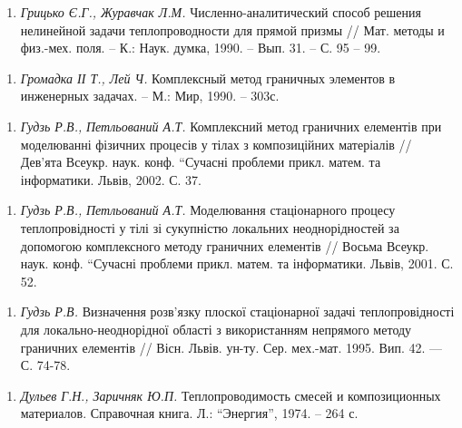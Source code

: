 \begin{enumerate}
\def\labelenumi{\arabic{enumi}.}
\tightlist
\item
  \emph{Грицько Є.Г., Журавчак Л.М. }Численно-аналитический способ
  решения нелинейной задачи теплопроводности для прямой призмы // Мат.
  методы и физ.-мех. поля. -- К.: Наук. думка, 1990. -- Вып. 31. -- С.
  95 -- 99.
\end{enumerate}

\begin{enumerate}
\def\labelenumi{\arabic{enumi}.}
\tightlist
\item
  \protect\hypertarget{anchor-6}{}{}\emph{Громадка ІІ Т., Лей Ч.}
  Комплексный метод граничных элементов в инженерных задачах. -- М.:
  Мир, 1990. -- 303с.
\end{enumerate}

\begin{enumerate}
\def\labelenumi{\arabic{enumi}.}
\tightlist
\item
  \emph{ Гудзь Р.В.,} \emph{Петльований А.Т. }Комплексний метод
  граничних елементів при моделюванні фізичних процесів у тілах з
  композиційних матеріалів // Дев'ята Всеукр. наук. конф. ``Сучасні
  проблеми прикл. матем. та інформатики. Львів, 2002. С. 37.
\end{enumerate}

\begin{enumerate}
\def\labelenumi{\arabic{enumi}.}
\tightlist
\item
  \emph{ Гудзь Р.В.,} \emph{Петльований А.Т. }Моделювання стаціонарного
  процесу теплопровідності у тілі зі сукупністю локальних
  неоднорідностей за допомогою комплексного методу граничних елементів
  // Восьма Всеукр. наук. конф. ``Сучасні проблеми прикл. матем. та
  інформатики. Львів, 2001. С. 52.
\end{enumerate}

\begin{enumerate}
\def\labelenumi{\arabic{enumi}.}
\tightlist
\item
  \emph{ }\protect\hypertarget{anchor-7}{}{}\emph{Гудзь Р.В.} Визначення
  розв'язку плоскої стаціонарної задачі теплопровідності для
  локально-неоднорідної області з використанням непрямого методу
  граничних елементів // Вісн. Львів. ун-ту. Сер. мех.-мат. 1995. Вип.
  42. --- С. 74-78.
\end{enumerate}

\begin{enumerate}
\def\labelenumi{\arabic{enumi}.}
\tightlist
\item
  \emph{ Дульев Г}.\emph{Н}.\emph{, Заричняк Ю.П. }Теплопроводимость
  смесей и композиционных материалов. Справочная книга. Л.: ``Энергия'',
  1974. -- 264 с.
\end{enumerate}

